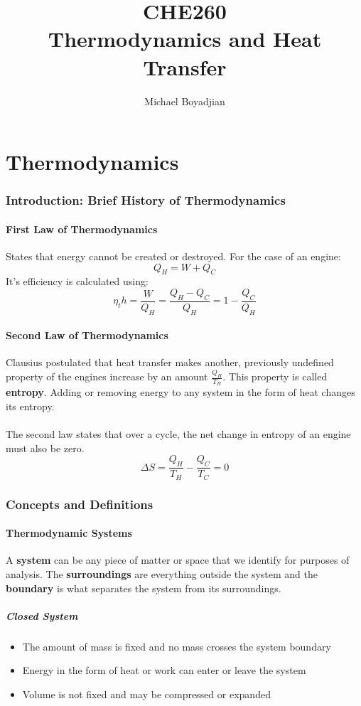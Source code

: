 \documentclass[11pt]{article}
\begin{document}
\title{CHE260 \\ Thermodynamics and Heat Transfer}
\author{Michael Boyadjian}
\maketitle
\pagebreak

\tableofcontents

\pagebreak
\part{Thermodynamics}
\section{Introduction: Brief History of Thermodynamics}
\subsection{First Law of Thermodynamics}
States that energy cannot be created or destroyed. For the case of an engine:
$$ Q_H = W + Q_C$$
It's efficiency is calculated using:
$$ \eta_th = \frac{W}{Q_H} =  \frac{Q_H - Q_C}{Q_H} = 1 - \frac{Q_C}{Q_H}$$
\subsection{Second Law of Thermodynamics}
Clausius postulated that heat transfer makes another, previously undefined property of the engines increase by an amount $\frac{Q_H}{T_H}$. This property is called \textbf{entropy}. Adding or removing energy to any system in the form of heat changes its entropy. \\ \\
The second law states that over a cycle, the net change in entropy of an engine must also be zero.
$$\Delta S = \frac{Q_H}{T_H} - \frac{Q_C}{T_C} = 0$$
\pagebreak
\section{Concepts and Definitions}
\subsection{Thermodynamic Systems}
A \textbf{system} can be any piece of matter or space that we identify for purposes of analysis. The \textbf{surroundings} are everything outside the system and the \textbf{boundary} is what separates the system from its surroundings.
\subsubsection{Closed System}
\begin{itemize}
\item The amount of mass is fixed and no mass crosses the system boundary
\item Energy in the form of heat or work can enter or leave the system
\item Volume is not fixed and may be compressed or expanded
\end{itemize}
\end{document}
